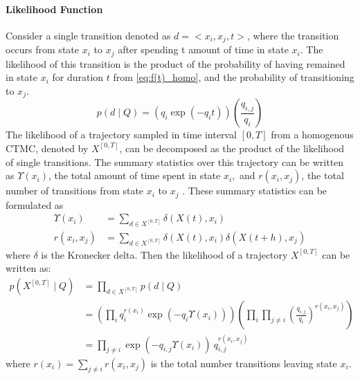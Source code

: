 \paragraph*{Likelihood Function}
\label{sec:llh_of_homo}
Consider a single transition denoted as $ d = <x_{i},x_{j},t> $, where the transition occurs from state $ x_{i} $ to $ x_{j} $ after spending t amount of time in state $ x_{i} $. The likelihood of this transition is the product of the probability of having remained in state $ x_{i} $ for duration $ t $ from \autoref{eq:f(t)_homo}, and the probability of transitioning to $ x_{j} $.
\begin{equation}
p(d  \mid Q) = \left( q_{i}\exp(-q_{i}t) \right) \left( \frac{q_{i,j}}{q_{i}} \right)
\end{equation}
The likelihood of a trajectory sampled in time interval $ [0, T] $ from a homogenous CTMC, denoted by $ X^{[0,T]} $, can be decomposed as the product of the likelihood of single transitions. The summary statistics over this trajectory can be written as $ \Upsilon(x_{i}) $, the total amount of time spent in state $ x_{i}, $ and  $ r(x_{i}, x_{j}) $, the total number of transitions from state $ x_{i} $ to $ x_{j} $ \cite{Nodelman2003}. These summary statistics can be formulated as
\begin{align}
\Upsilon(x_i) &= \sum_{d \in X^{[0,T]}} \delta(X(t), x_i) \label{eq:sum_stat_ups}\\
r(x_i,x_j) & = \sum_{d \in X^{[0,T]}} \delta(X(t), x_i) \delta(X(t+h), x_j) \label{eq:sum_stat_r}
\end{align}
where $ \delta $ is the Kronecker delta.
Then the likelihood of a trajectory $  X^{[0,T]} $ can be written as:
\begin{align}
p(X^{[0,T]}  \mid Q) &=  \prod_{d \in X^{[0,T]}} p(d \mid Q) \nonumber\\&=\left(\prod_{ i} q_{i}^{r(x_{i})} \exp \left(-q_{i} \Upsilon(x_{i})\right)\right)\left(\prod_{ i} \prod_{ j \neq i} \left(\frac{q_{i,j}}{q_{i}}\right)^{r(x_{i}, x_{j})}\right) \nonumber\\ & = \prod_{j \neq i}  \exp(-q_{i,j}\Upsilon(x_{i}))\ q_{i,j}^{r(x_{i},x_{j})}
\label{eq:lh_traj_homo}
\end{align}
where $ r(x_{i}) = \sum_{j \neq i} r(x_{i}, x_{j}) $ is the total number transitions leaving state $ x_{i} $.

